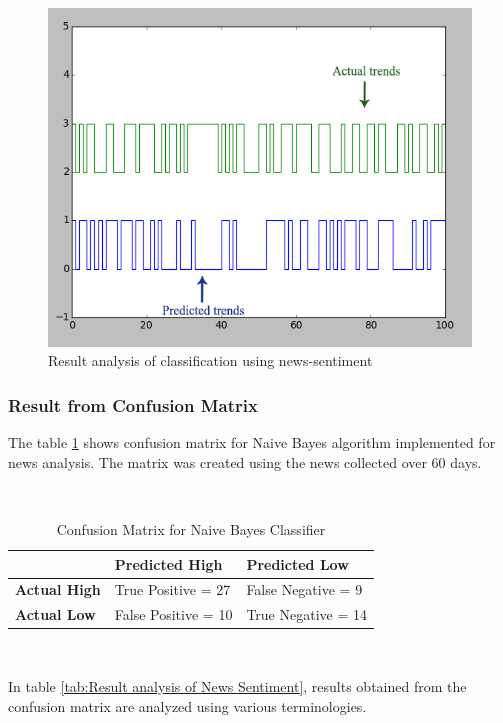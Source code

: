 \begin{figure}[H]\centering
  \includegraphics[width=\textwidth]{fig/news}
  \caption{Result analysis of classification using news-sentiment}
  \label{fig:news}
\end{figure}

\subsubsection{Result from Confusion Matrix}
The table \ref{tab:confusion} shows confusion matrix for Naive Bayes algorithm implemented for news analysis. The matrix was created using the news collected over 60 days.

~

\begin{table}[h!]
	\centering
	\begin{tabular}{|l|l|l|}
	\hline
	& \textbf{Predicted High} & \textbf{Predicted Low} \\
	\hline
\textbf{Actual High} & True Positive = 27 & False Negative = 9\\
	\hline
\textbf{Actual Low}	& False Positive = 10 & True Negative = 14\\
	\hline
	\end{tabular}
	\caption{Confusion Matrix for Naive Bayes Classifier}
	\label{tab:confusion}
\end{table}

~

\newpage
In table \ref{tab:Result analysis of News Sentiment}, results obtained from the confusion matrix are analyzed using various terminologies. 
 
